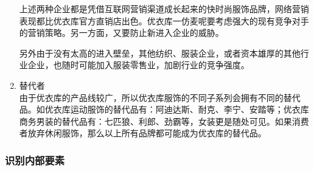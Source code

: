 \documentclass{xjtureport}
\begin{document}
\begin{enumerate}
    上述两种企业都是凭借互联网营销渠道成长起来的快时尚服饰品牌，网络营销表现都比优衣库官方直销店出色。优衣库一仿麦呢要考虑强大的现有竞争对手的营销策略。另一方面，又要防止新进入企业的威胁。

    另外由于没有太高的进入壁垒，其他纺织、服装企业，或者资本雄厚的其他行业企业，也随时可能加入服装零售业，加剧行业的竞争强度。
    \item 替代者\\
    由于优衣库的产品线较广，所以优衣库服饰的不同子系列会拥有不同的替代品。如优衣库运动服饰的替代品有：阿迪达斯、耐克、李宁、安踏等；优衣库商务男装的替代品有：七匹狼、利郎、劲霸等，女装更是随处可见。如果消费者放弃休闲服饰，那么以上所有品牌都可能成为优衣库的替代品。
\end{enumerate}
\subsubsection{识别内部要素}
\end{document}
